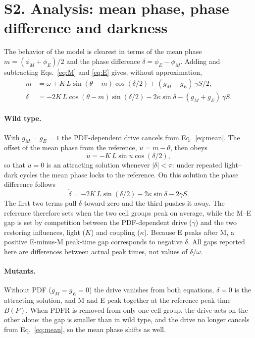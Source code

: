 \documentclass[10pt,a4paper]{article}
\begin{document}
\section*{S2. Analysis: mean phase, phase difference and darkness}
The behavior of the model is clearest in terms of the mean phase
$m=(\phi_M+\phi_E)/2$ and the phase difference $\delta=\phi_E-\phi_M$.
Adding and subtracting Eqs.~\eqref{eq:M} and \eqref{eq:E} gives, without
approximation,
\begin{align}
 \dot m&=\omega+K\,L\sin(\theta-m)\cos(\delta/2)
                      +(g_M-g_E)\,\gamma S/2,\label{eq:mean}\\
 \dot\delta&=-2K\,L\cos(\theta-m)\sin(\delta/2)
                      -2\kappa\sin\delta-(g_M+g_E)\,\gamma S.\label{eq:gap}
\end{align}

\paragraph{Wild type.}
With $g_M=g_E=1$ the PDF-dependent drive cancels from
Eq.~\eqref{eq:mean}. The offset of the mean phase from the reference,
$u=m-\theta$, then obeys
\begin{equation}
 \dot u=-K\,L\sin u\cos(\delta/2),
\end{equation}
so that $u=0$ is an attracting solution whenever $|\delta|<\pi$: under
repeated light--dark cycles the mean phase locks to the reference. On
this solution the phase difference follows
\begin{equation}
 \dot\delta=-2K\,L\sin(\delta/2)-2\kappa\sin\delta-2\gamma S.
 \label{eq:wtgap}
\end{equation}
The first two terms pull $\delta$ toward zero and the third pushes it
away. The reference therefore sets when the two cell groups peak on
average, while the M--E gap is set by competition between the
PDF-dependent drive ($\gamma$) and the two restoring influences, light
($K$) and coupling ($\kappa$). Because E peaks after M, a positive
E-minus-M peak-time gap corresponds to negative $\delta$. All gaps
reported here are differences between actual peak times, not values of
$\delta/\omega$.

\paragraph{Mutants.}
Without PDF ($g_M=g_E=0$) the drive vanishes from both equations,
$\delta=0$ is the attracting solution, and M and E peak together at the
reference peak time $B(P)$. When PDFR is removed from only one cell
group, the drive acts on the other alone: the gap is smaller than in
wild type, and the drive no longer cancels from Eq.~\eqref{eq:mean}, so
the mean phase shifts as well.
\end{document}
